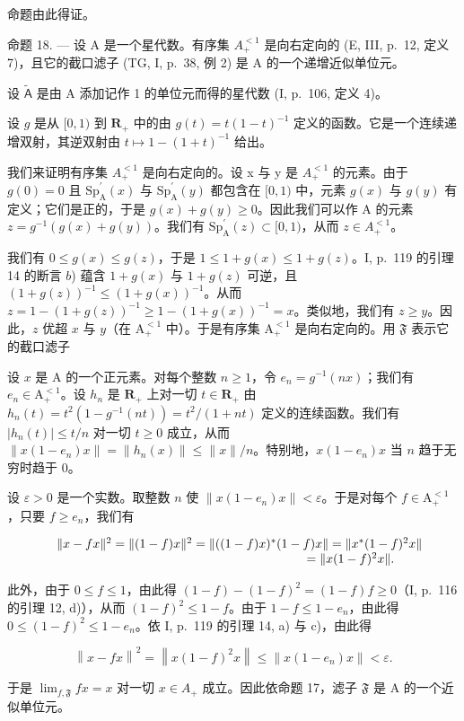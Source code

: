 命题由此得证。

命题 18. --- 设 A 是一个星代数。有序集 \(A_{+}^{<1}\) 是向右定向的 (E, III, p.~12, 定义 7)，且它的截口滤子 (TG, I, p.~38, 例 2) 是 A 的一个递增近似单位元。

设 \(\widetilde{\mathsf{A}}\) 是由 A 添加记作 1 的单位元而得的星代数 (I, p.~106, 定义 4)。

设 \(g\) 是从 \([0,1)\) 到 \(\mathbf{R}_+\) 中的由 \(g(t) = t(1 - t)^{-1}\) 定义的函数。它是一个连续递增双射，其逆双射由 \(t \mapsto 1 - (1 + t)^{-1}\) 给出。

我们来证明有序集 \(A_{+}^{<1}\) 是向右定向的。设 x 与 y 是 \(A_{+}^{<1}\) 的元素。由于 \(g(0)=0\) 且 \(\mathrm{Sp}_{\mathrm{A}}^{\prime}(x)\) 与 \(\mathrm{Sp}_{\mathrm{A}}^{\prime}(y)\) 都包含在 \([0,1)\) 中，元素 \(g(x)\) 与 \(g(y)\) 有定义；它们是正的，于是 \(g(x)+g(y)\geqslant0\)。因此我们可以作 A 的元素 \(z=g^{-1}(g(x)+g(y))\)。我们有 \(\mathrm{Sp}_{\mathrm{A}}^{\prime}(z)\subset[0,1)\)，从而 \(z\in A_{+}^{<1}\)。

我们有 \(0 \leqslant g(x) \leqslant g(z)\)，于是 \(1 \leqslant 1 + g(x) \leqslant 1 + g(z)\)。I, p.~119 的引理 14 的断言 \(b\)) 蕴含 \(1 + g(x)\) 与 \(1 + g(z)\) 可逆，且 \((1 + g(z))^{-1} \leqslant (1 + g(x))^{-1}\)。从而 \(z = 1 - (1 + g(z))^{-1} \geqslant 1 - (1 + g(x))^{-1} = x\)。类似地，我们有 \(z \geqslant y\)。因此，\(z\) 优超 \(x\) 与 \(y\)（在 \(\mathrm{A}_{+}^{<1}\) 中）。于是有序集 \(\mathrm{A}_{+}^{<1}\) 是向右定向的。用 \(\mathfrak{F}\) 表示它的截口滤子

设 \(x\) 是 A 的一个正元素。对每个整数 \(n \geqslant 1\)，令 \(e_n = g^{-1}(nx)\)；我们有 \(e_n \in \mathrm{A}_+^{<1}\)。设 \(h_n\) 是 \(\mathbf{R}_+\) 上对一切 \(t \in \mathbf{R}_+\) 由 \(h_n(t) = t^2(1 - g^{-1}(nt)) = t^2 / (1 + nt)\) 定义的连续函数。我们有 \(|h_n(t)| \leqslant t / n\) 对一切 \(t \geqslant 0\) 成立，从而 \(\| x(1 - e_n)x \| = \| h_n(x) \| \leqslant \| x \| / n\)。特别地，\(x(1 - e_n)x\) 当 \(n\) 趋于无穷时趋于 0。

设 \(\varepsilon > 0\) 是一个实数。取整数 \(n\) 使 \(\|x(1 - e_n)x\| < \varepsilon\)。于是对每个 \(f \in \mathrm{A}_+^{<1}\)，只要 \(f \geqslant e_n\)，我们有

\[
\begin{array}{r l} & {\| x - f x \| ^ {2} = \| (1 - f) x \| ^ {2} = \| ((1 - f) x) ^ {*} (1 - f) x \| = \| x ^ {*} (1 - f) ^ {2} x \|} \\ & {\qquad \qquad \qquad \qquad \qquad \qquad \qquad \qquad \qquad \qquad = \| x (1 - f) ^ {2} x \|.} \end{array}
\]

此外，由于 \(0 \leqslant f \leqslant 1\)，由此得 \((1-f)-(1-f)^{2} = (1-f)f \geqslant 0\)（I, p.~116 的引理 12, d)），从而 \((1-f)^{2} \leqslant 1-f\)。由于 \(1-f \leqslant 1-e_{n}\)，由此得 \(0 \leqslant (1-f)^{2} \leqslant 1-e_{n}\)。依 I, p.~119 的引理 14, a) 与 c)，由此得

\[
\left\| x - f x \right\| ^ {2} = \left\| x (1 - f) ^ {2} x \right\| \leqslant \left\| x (1 - e _ {n}) x \right\| <   \varepsilon .
\]

于是 \(\lim_{f,\mathfrak{F}}fx = x\) 对一切 \(x \in A_{+}\) 成立。因此依命题 17，滤子 \(\mathfrak{F}\) 是 A 的一个近似单位元。

